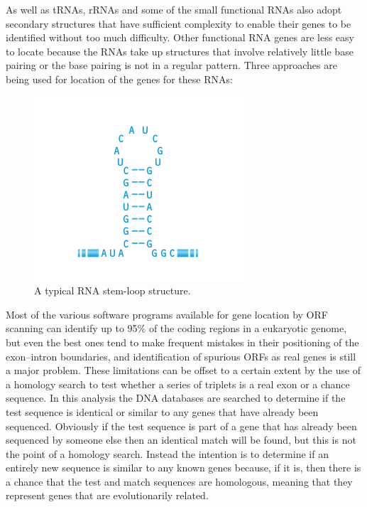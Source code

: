 As well as tRNAs, rRNAs and some of the small functional RNAs also adopt secondary structures that have sufficient complexity to enable their genes 
to be identified without too much difficulty. Other functional RNA genes are less easy to locate because the RNAs take up structures that involve 
relatively little base pairing or the base pairing is not in a regular pattern. Three approaches are being used for location of the genes for these RNAs:

\begin{figure}[!ht]
	\centering
	\includegraphics[width=.9\textwidth]{figures/rna.png}
	\caption{A typical RNA stem-loop
	structure.\label{o:latex_friendly_zone}}
\end{figure}

Most of the various software programs available for gene location by ORF scanning can identify up to 95\% of the coding regions in a eukaryotic
genome, but even the best ones tend to make frequent mistakes in their positioning of the exon–intron boundaries, and identification of spurious ORFs as
real genes is still a major problem. These limitations can be offset to a certain extent by the use of a homology search to test whether a series of triplets is a
real exon or a chance sequence. In this analysis the DNA databases are searched to determine if the test sequence is identical or similar to any genes
that have already been sequenced. Obviously if the test sequence is part of a gene that has already been sequenced by someone else then an identical
match will be found, but this is not the point of a homology search. Instead the intention is to determine if an entirely new sequence is similar to any
known genes because, if it is, then there is a chance that the test and match sequences are homologous, meaning that they represent genes that are evolutionarily related. 


